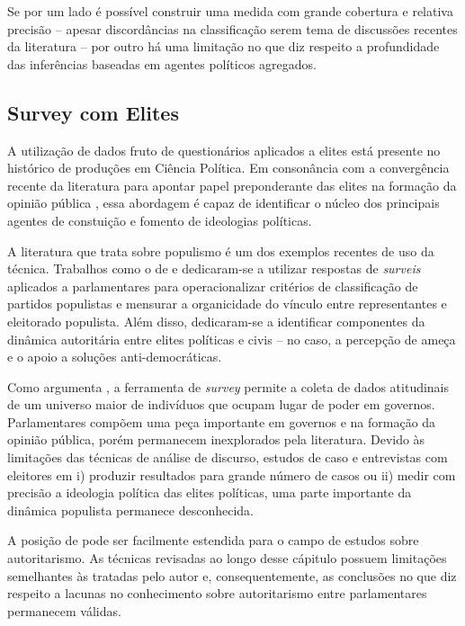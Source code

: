 \documentclass[
12pt,				%
openright,			%
twoside,			%
a4paper,			%
english,			%
french,				%
spanish,			%
brazil				%
]{abntex2}
\begin{document}
Se por um lado é possível construir uma medida com grande cobertura e relativa precisão -- apesar discordâncias na classificação serem tema de discussões recentes da literatura \cite{glasius2018authoritarianism, mudde2016introduction} -- por outro há uma limitação no que diz respeito a profundidade das inferências baseadas em agentes políticos agregados.

\vspace{2cm}

\subsection{Survey com Elites}

A utilização de dados fruto de questionários aplicados a elites está presente no histórico de produções em Ciência Política\cite{hoffmann2007methods, andreadis2017elite}. Em consonância com a convergência recente da literatura para apontar papel preponderante das elites na formação da opinião pública \cite{zaller1992nature, gabel2007estimating, achen2017democracy}, essa abordagem é capaz de identificar o núcleo dos principais agentes de constuição e fomento de ideologias políticas.

A literatura que trata sobre populismo é um dos exemplos recentes de uso da técnica. Trabalhos como o de  e  dedicaram-se a utilizar respostas de \emph{surveis} aplicados a parlamentares para operacionalizar critérios de classificação de partidos populistas e mensurar a organicidade do vínculo entre representantes e eleitorado populista. Além disso,  dedicaram-se a identificar componentes da dinâmica autoritária entre elites políticas e civis -- no caso, a percepção de ameça e o apoio a soluções anti-democráticas.

Como argumenta , a ferramenta de \emph{survey} permite a coleta de dados atitudinais de um universo maior de indivíduos que ocupam lugar de poder em governos. Parlamentares compõem uma peça importante em governos e na formação da opinião pública, porém permanecem inexplorados pela literatura. Devido às limitações das técnicas de análise de discurso, estudos de caso e entrevistas com eleitores em i) produzir resultados para grande número de casos ou ii) medir com precisão a ideologia política das elites políticas, uma parte importante da dinâmica populista permanece desconhecida. 

A posição de  pode ser facilmente estendida para o campo de estudos sobre autoritarismo. As técnicas revisadas ao longo desse cápitulo possuem limitações semelhantes às tratadas pelo autor e, consequentemente, as conclusões no que diz respeito a lacunas no conhecimento sobre autoritarismo entre parlamentares permanecem válidas. 
\end{document}
